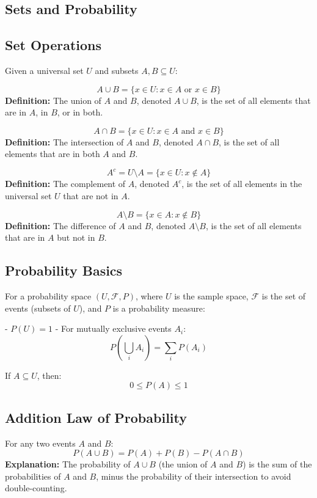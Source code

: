 \documentclass{article}
\begin{document}
\begin{multicols}{2}

\section*{Sets and Probability}

\subsection*{Set Operations}
Given a universal set \( U \) and subsets \( A, B \subseteq U \):

\[
A \cup B = \{ x \in U : x \in A \text{ or } x \in B \}
\]
\textbf{Definition:} The union of \(A\) and \(B\), denoted \(A \cup B\), is the set of all elements that are in \(A\), in \(B\), or in both.

\[
A \cap B = \{ x \in U : x \in A \text{ and } x \in B \}
\]
\textbf{Definition:} The intersection of \(A\) and \(B\), denoted \(A \cap B\), is the set of all elements that are in both \(A\) and \(B\).

\[
A^c = U \setminus A = \{ x \in U : x \notin A \}
\]
\textbf{Definition:} The complement of \(A\), denoted \(A^c\), is the set of all elements in the universal set \(U\) that are not in \(A\).

\[
A \setminus B = \{ x \in A : x \notin B \}
\]
\textbf{Definition:} The difference of \(A\) and \(B\), denoted \(A \setminus B\), is the set of all elements that are in \(A\) but not in \(B\).

\subsection*{Probability Basics}
For a probability space \((U, \mathcal{F}, P)\), where \( U \) is the sample space, \(\mathcal{F}\) is the set of events (subsets of \( U \)), and \(P\) is a probability measure:

- \(P(U) = 1\)
- For mutually exclusive events \( A_i \):
\[
P\left(\bigcup_i A_i\right) = \sum_i P(A_i)
\]

If \(A \subseteq U\), then:
\[
0 \leq P(A) \leq 1
\]

\subsection*{Addition Law of Probability}
For any two events \(A\) and \(B\):
\[
P(A \cup B) = P(A) + P(B) - P(A \cap B)
\]
\textbf{Explanation:} The probability of \(A \cup B\) (the union of \(A\) and \(B\)) is the sum of the probabilities of \(A\) and \(B\), minus the probability of their intersection to avoid double-counting.


\end{multicols}
\end{document}
